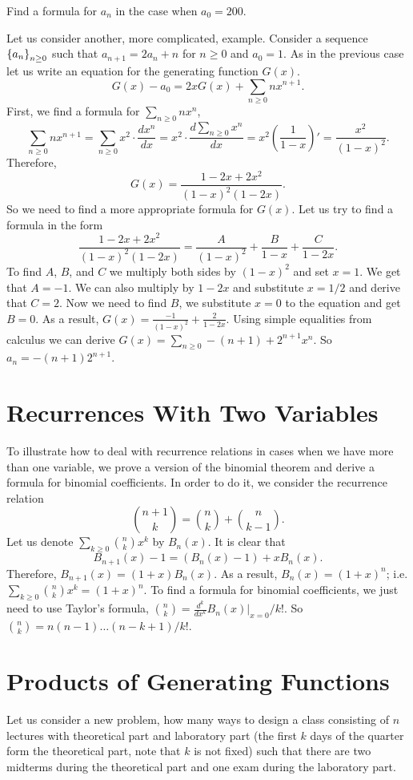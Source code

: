 \begin{exercise}
  Find a formula for $a_n$ in the case when $a_0 = 200$.
\end{exercise}

Let us consider another, more complicated, example. Consider a sequence
$\set{a_n}_{n \ge 0}$ such that $a_{n + 1} = 2a_n + n$ for $n \ge 0$ and
$a_0 = 1$. As in the previous case let us write an equation for the
generating function $G(x)$.
\[
  G(x) - a_0 = 2xG(x) + \sum_{n \ge 0} n x^{n + 1}.
\]
First, we find a formula for $\sum_{n \ge 0} n x^n$,
\[
  \sum_{n \ge 0} n x^{n + 1} = \sum_{n \ge 0} x^2 \cdot \frac{d x^n}{dx} =
  x^2 \cdot \frac{d \sum_{n \ge 0} x^n}{dx} = x^2 \left(\frac{1}{1 - x}\right)'
  = \frac{x^2}{(1 - x)^2}.
\]
Therefore,
\[
  G(x) = \frac{1 - 2x + 2x^2}{(1 - x)^2 (1 - 2x)}.
\]
So we need to find a more appropriate formula for $G(x)$.
Let us try to find a formula in the form
\[
  \frac{1 - 2x + 2x^2}{(1 - x)^2 (1 - 2x)} =
    \frac{A}{(1 - x)^2} + \frac{B}{1 - x} + \frac{C}{1 - 2x}.
\]
To find $A$, $B$, and $C$ we multiply both sides by $(1 - x)^2$ and set $x = 1$.
We get that $A = -1$. We can also multiply by $1 - 2x$ and substitute
$x = 1 / 2$ and derive that $C = 2$. Now we need to find $B$, we substitute $x =
0$ to the equation and get $B = 0$. As a result,
$G(x) = \frac{-1}{(1 - x)^2} + \frac{2}{1 - 2x}$. Using simple equalities from
calculus we can derive $G(x) = \sum_{n \ge 0} -(n + 1) + 2^{n + 1} x^n$.
So $a_n = -(n + 1) 2^{n + 1}$.

\section{Recurrences With Two Variables}
To illustrate how to deal with recurrence relations in cases when we have
more than one variable, we prove a version of the binomial theorem and
derive a formula for binomial coefficients. In order to do it,
we consider the recurrence relation
\[
  \binom{n + 1}{k} = \binom{n}{k} + \binom{n}{k - 1}.
\]
Let us denote $\sum_{k \ge 0} \binom{n}{k} x^k$ by $B_n(x)$.
It is clear that
\[
  B_{n + 1}(x) - 1 = (B_n(x) - 1) + x B_n(x).
\]
Therefore, $B_{n + 1}(x) = (1 + x) B_n(x)$. As a result, $B_n(x) = (1 + x)^n$;
i.e. $\sum_{k \ge 0} \binom{n}{k} x^k = (1 + x)^n$. To find a
formula for binomial coefficients, we just need to use Taylor's formula,
$\binom{n}{k} = \frac{d^k}{dx^k} B_n(x)\big\rvert_{x = 0}  / k!$. So
$\binom{n}{k} = n (n - 1) \dots (n - k + 1) / k!$.

\section{Products of Generating Functions}
Let us consider a new problem, how many ways to design a class consisting of
$n$ lectures with theoretical part and laboratory part (the first $k$ days of
the quarter form the theoretical part, note that $k$ is not fixed) such that
there are two midterms during the theoretical part and one exam during the
laboratory part.

